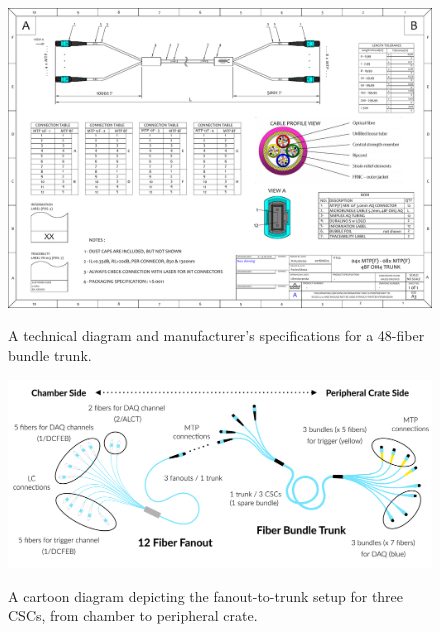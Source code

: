 \begin{figure}[H]
    \centering
    {\includegraphics[width=1\textwidth]{Images/Phase2Upgrades/OpticalFibers/TRUNK_C2202.pdf}}
    \caption{A technical diagram and manufacturer's specifications for a 48-fiber bundle trunk.}
    \label{fig:trunkspecs}
\end{figure}

\begin{figure}[H]
    \centering
    {\includegraphics[width=1\textwidth]{Images/Phase2Upgrades/OpticalFibers/FanoutTrunkCartoon.png}}
    \caption{A cartoon diagram depicting the fanout-to-trunk setup for three CSCs, from chamber to peripheral crate.}
    \label{fig:fanouttrunkcartoon}
\end{figure}

